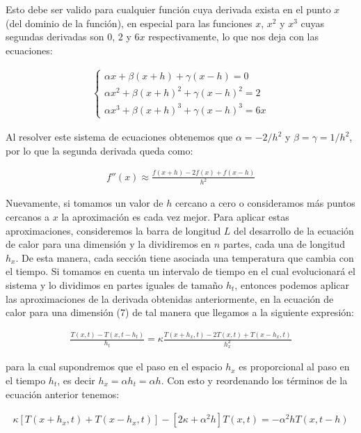 \documentclass[12pt]{article}
\begin{document}
Esto debe ser valido para cualquier función cuya derivada exista en el punto $x$ (del dominio de la función), en especial para las funciones $x$, $x^2$ y $x^3$ cuyas segundas derivadas son $0$, $2$ y $6x$ respectivamente, lo que nos deja con las ecuaciones:

\begin{align}
    \begin{cases}
        \alpha x + \beta (x+h) + \gamma (x-h) = 0\\
        \alpha x^2 + \beta (x+h)^2 + \gamma (x-h)^2 = 2 \\
        \alpha x^3 + \beta (x+h)^3 + \gamma (x-h)^3 = 6x
    \end{cases}
\end{align}

Al resolver este sistema de ecuaciones obtenemos que $\alpha = -2/h^2$ y $\beta = \gamma = 1/h^2$, por lo que la segunda derivada queda como:

\begin{align*}
    f''(x) \approx \frac{f(x+h) - 2f(x) + f(x-h)}{h^2}
\end{align*}

Nuevamente, si tomamos un valor de $h$ cercano a cero o consideramos más puntos cercanos a $x$ la aproximación es cada vez mejor. Para aplicar estas aproximaciones, consideremos la barra de longitud $L$ del desarrollo de la ecuación de calor para una dimensión y la dividiremos en $n$ partes, cada una de longitud $h_x$. De esta manera, cada sección tiene asociada una temperatura que cambia con el tiempo. Si tomamos en cuenta un intervalo de tiempo en el cual evolucionará el sistema y lo dividimos en partes iguales de tamaño $h_t$, entonces podemos aplicar las aproximaciones de la derivada obtenidas anteriormente, en la ecuación de calor para una dimensión (7) de tal manera que llegamos a la siguiente expresión:

\begin{align*}
    \frac{T(x,t)-T(x,t-h_t)}{h_t} = \kappa \frac{T(x+h_x,t) - 2T(x,t) + T(x-h_x,t)}{h_x^2}
\end{align*}

para la cual supondremos que el paso en el espacio $h_x$ es proporcional al paso en el tiempo $h_t$, es decir $h_x = \alpha h_t = \alpha h$. Con esto y reordenando los términos de la ecuación anterior tenemos:

\begin{align*}
    \kappa[T(x+h_x,t) + T(x-h_x,t)] - [2\kappa + \alpha^2 h]T(x,t) = -\alpha^2 h T(x,t-h)
\end{align*}
\end{document}
